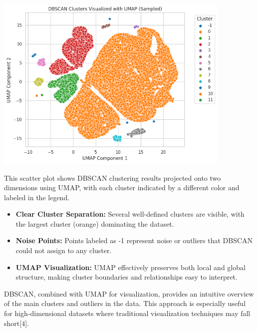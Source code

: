 \documentclass[a4paper]{article}
\begin{document}
\begin{multicols}{2}
\vspace{1em}

\noindent
\begin{minipage}{\columnwidth}
\centering
\includegraphics[width=0.85\textwidth]{plots/DBSCAN Clusters Visualized with UMAP (Sampled).png}
\label{fig:dbscan_umap}
\end{minipage}

This scatter plot shows DBSCAN clustering results projected onto two dimensions using UMAP, with each cluster indicated by a different color and labeled in the legend.

\begin{itemize}
    \item \textbf{Clear Cluster Separation:} Several well-defined clusters are visible, with the largest cluster (orange) dominating the dataset.
    \item \textbf{Noise Points:} Points labeled as -1 represent noise or outliers that DBSCAN could not assign to any cluster.
    \item \textbf{UMAP Visualization:} UMAP effectively preserves both local and global structure, making cluster boundaries and relationships easy to interpret.
\end{itemize}

DBSCAN, combined with UMAP for visualization, provides an intuitive overview of the main clusters and outliers in the data. This approach is especially useful for high-dimensional datasets where traditional visualization techniques may fall short[4].



\end{multicols}
\end{document}
